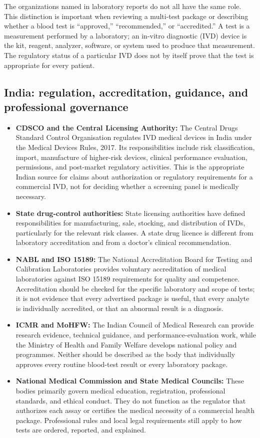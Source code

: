 \documentclass[11pt,openany]{book}
\begin{document}
The organizations named in laboratory reports do not all have the same role.
This distinction is important when reviewing a multi-test package or describing
whether a blood test is ``approved,'' ``recommended,'' or ``accredited.'' A
test is a measurement performed by a laboratory; an in-vitro diagnostic (IVD)
device is the kit, reagent, analyzer, software, or system used to produce that
measurement. The regulatory status of a particular IVD does not by itself prove
that the test is appropriate for every patient.

\subsection*{India: regulation, accreditation, guidance, and professional governance}

\begin{itemize}[leftmargin=*]
  \item \textbf{CDSCO and the Central Licensing Authority:} The Central Drugs
  Standard Control Organisation regulates IVD medical devices in India under
  the Medical Devices Rules, 2017. Its responsibilities include risk
  classification, import, manufacture of higher-risk devices, clinical
  performance evaluation, permissions, and post-market regulatory activities.
  This is the appropriate Indian source for claims about authorization or
  regulatory requirements for a commercial IVD, not for deciding whether a
  screening panel is medically necessary.
  \item \textbf{State drug-control authorities:} State licensing authorities
  have defined responsibilities for manufacturing, sale, stocking, and
  distribution of IVDs, particularly for the relevant risk classes. A state
  drug licence is different from laboratory accreditation and from a doctor's
  clinical recommendation.
  \item \textbf{NABL and ISO 15189:} The National Accreditation Board for
  Testing and Calibration Laboratories provides voluntary accreditation of
  medical laboratories against ISO 15189 requirements for quality and
  competence. Accreditation should be checked for the specific laboratory and
  scope of tests; it is not evidence that every advertised package is useful,
  that every analyte is individually accredited, or that an abnormal result is
  a diagnosis.
  \item \textbf{ICMR and MoHFW:} The Indian Council of Medical Research can
  provide research evidence, technical guidance, and performance-evaluation
  work, while the Ministry of Health and Family Welfare develops national
  policy and programmes. Neither should be described as the body that
  individually approves every routine blood-test result or every laboratory
  package.
  \item \textbf{National Medical Commission and State Medical Councils:}
  These bodies primarily govern medical education, registration, professional
  standards, and ethical conduct. They do not function as the regulator that
  authorizes each assay or certifies the medical necessity of a commercial
  health package. Professional rules and local legal requirements still apply
  to how tests are ordered, reported, and explained.
\end{itemize}
\end{document}
